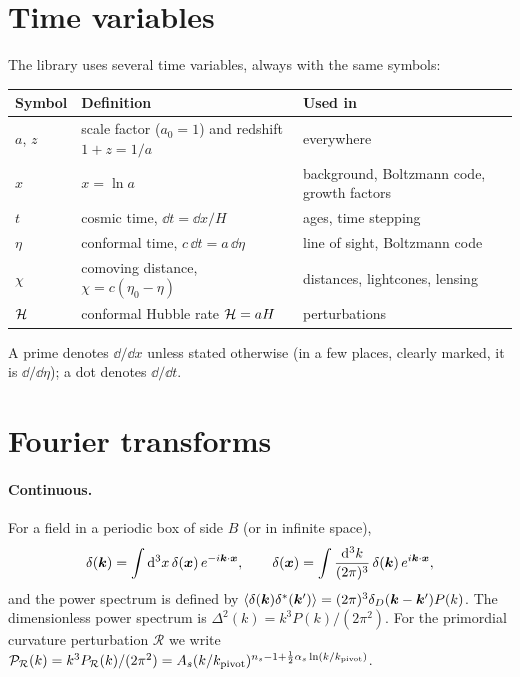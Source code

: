 \section{Time variables}

The library uses several time variables, always with the same symbols:
\begin{center}\small
\begin{tabular}{@{}lll@{}}
\toprule
Symbol & Definition & Used in \\
\midrule
$a$, $z$ & scale factor ($a_0=1$) and redshift $1+z=1/a$ & everywhere \\
$x$ & $x=\ln a$ & background, Boltzmann code, growth factors \\
$t$ & cosmic time, $\dd t=\dd x/H$ & ages, time stepping \\
$\eta$ & conformal time, $c\,\dd t=a\,\dd\eta$ & line of sight, Boltzmann code \\
$\chi$ & comoving distance, $\chi=c(\eta_0-\eta)$ & distances, lightcones, lensing \\
$\mathcal{H}$ & conformal Hubble rate $\mathcal{H}=aH$ & perturbations \\
\bottomrule
\end{tabular}
\end{center}
A prime denotes $\dd/\dd x$ unless stated otherwise (in a few places, clearly marked, it is $\dd/\dd\eta$); a dot
denotes $\dd/\dd t$.

\section{Fourier transforms}

\paragraph*{Continuous.} For a field in a periodic box of side $B$ (or in infinite space),
\begin{equation}
\delta(\bm{k})=\int\mathrm{d}^3x\,\delta(\bm{x})\,e^{-i\bm{k}\cdot\bm{x}},\qquad
\delta(\bm{x})=\int\frac{\mathrm{d}^3k}{(2\pi)^3}\,\delta(\bm{k})\,e^{i\bm{k}\cdot\bm{x}},
\end{equation}
and the power spectrum is defined by
$\langle\delta(\bm{k})\delta^*(\bm{k}')\rangle=(2\pi)^3\delta_D(\bm{k}-\bm{k}')P(k)$. The dimensionless power spectrum is
$\Delta^2(k)=k^3P(k)/(2\pi^2)$. For the primordial curvature perturbation $\mathcal{R}$ we write
$\mathcal{P}_\mathcal{R}(k)=k^3P_\mathcal{R}(k)/(2\pi^2)=A_s(k/k_{\rm pivot})^{n_s-1+\frac12\alpha_s\ln(k/k_{\rm pivot})}$.

